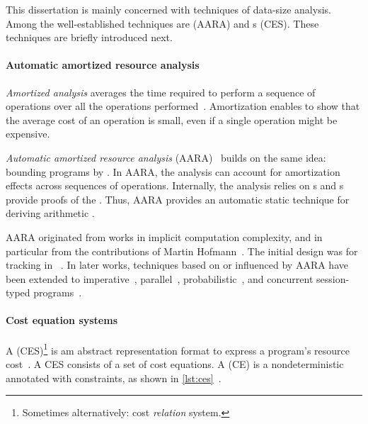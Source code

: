 This dissertation is mainly concerned with techniques of data-size analysis.
Among the well-established techniques are  (AARA) and s (CES). These techniques are
briefly introduced next.

\paragraph*{Automatic amortized resource analysis}  \emph{Amortized analysis} averages
the time required to perform a sequence of operations over all the operations
performed~\cite[p. 451]{cormen2009}. Amortization enables to
show that the average cost of an operation is small, even if a single operation
might be expensive.

\emph{Automatic amortized resource analysis}
(AARA)~\cite{hoffmann2022} builds
on the same idea: bounding programs by . In AARA, the analysis
can account for amortization effects across sequences of operations. Internally,
the analysis relies on s and s provide
proofs of the . Thus, AARA provides an automatic static
technique for deriving arithmetic .

AARA originated from works in implicit computation complexity, and in particular
from the contributions of Martin Hofmann~\cite{hoffmann2022}. The initial design
was for tracking  in ~\cite{hoffmann2012}. In later works, techniques based on or influenced
by AARA have been extended to imperative~\cite{carbonneaux2015,carbonneaux2017}, parallel~\cite{hoffmann2015}, probabilistic~\cite{avanzini2020,ngo2018,wang2020}, and concurrent session-typed
programs~\cite{das2018,das2021}.

\paragraph*{Cost equation systems}
A \emph{} (CES)\footnote{Sometimes alternatively: cost
\emph{relation} system.} is am abstract representation format to express a
program's resource cost~\cite{floresmontoya2017,albert2019}. A CES consists of a
set of cost equations. A \emph{} (CE) is a
nondeterministic  annotated with
constraints, as shown in \autoref{lst:ces}~\cite{floresmontoya2014}.


